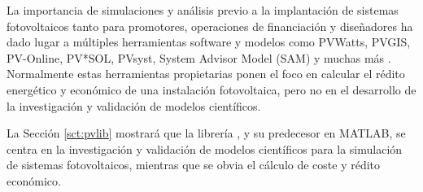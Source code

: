 La importancia de simulaciones y análisis previo a la implantación de sistemas fotovoltaicos tanto para promotores, operaciones de financiación y diseñadores ha dado lugar a múltiples herramientas \gls{software} y modelos como PVWatts, PVGIS, PV-Online, PV*SOL, PVsyst, System Advisor Model (SAM) y muchas más \cite{stein_models_2009, Kumar_2017}. Normalmente estas herramientas propietarias ponen el foco en calcular el rédito energético y económico de una instalación fotovoltaica, pero no en el desarrollo de la investigación y validación de modelos científicos.

La Sección \ref{sct:pvlib} mostrará que la librería \pvlibpy, y su predecesor en \gls{MATLAB}, se centra en la investigación y validación de modelos científicos para la simulación de sistemas fotovoltaicos, mientras que se obvia el cálculo de coste y rédito económico.
